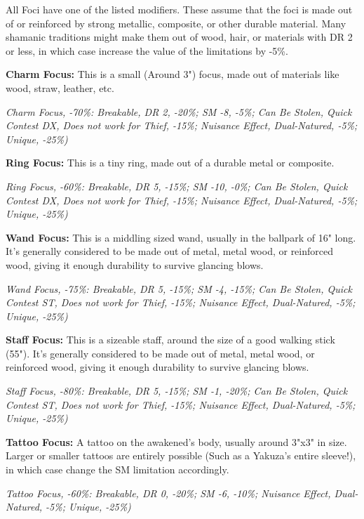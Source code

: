 \begin{multicols*}{2}
	All Foci have one of the listed modifiers. These assume that the foci is made out of or reinforced by strong metallic, composite, or other durable material. Many shamanic traditions might make them out of wood, hair, or materials with DR 2 or less, in which case increase the value of the limitations by -5\%.
	
	\textbf{Charm Focus:} This is a small (Around 3") focus, made out of materials like wood, straw, leather, etc.
	
	\textcolor{OliveGreen}{\textit{Charm Focus, -70\%: Breakable, DR 2, -20\%; SM -8, -5\%; Can Be Stolen, Quick Contest DX, Does not work for Thief, -15\%; Nuisance Effect, Dual-Natured, -5\%; Unique, -25\%)}}
	
	\textbf{Ring Focus:} This is a tiny ring, made out of a durable metal or composite.
	
	\textcolor{OliveGreen}{\textit{Ring Focus, -60\%: Breakable, DR 5, -15\%; SM -10, -0\%; Can Be Stolen, Quick Contest DX, Does not work for Thief, -15\%; Nuisance Effect, Dual-Natured, -5\%; Unique, -25\%)}}
	
	\textbf{Wand Focus:} This is a middling sized wand, usually in the ballpark of 16" long. It's generally considered to be made out of metal, metal wood, or reinforced wood, giving it enough durability to survive glancing blows.
	
	\textcolor{OliveGreen}{\textit{Wand Focus, -75\%: Breakable, DR 5, -15\%; SM -4, -15\%; Can Be Stolen, Quick Contest ST, Does not work for Thief, -15\%; Nuisance Effect, Dual-Natured, -5\%; Unique, -25\%)}}
	
	\textbf{Staff Focus:} This is a sizeable staff, around the size of a good walking stick (55"). It's generally considered to be made out of metal, metal wood, or reinforced wood, giving it enough durability to survive glancing blows.
	
	\textcolor{OliveGreen}{\textit{Staff Focus, -80\%: Breakable, DR 5, -15\%; SM -1, -20\%; Can Be Stolen, Quick Contest ST, Does not work for Thief, -15\%; Nuisance Effect, Dual-Natured, -5\%; Unique, -25\%)}}
	
	\textbf{Tattoo Focus:} A tattoo on the awakened's body, usually around 3"x3" in size. Larger or smaller tattoos are entirely possible (Such as a Yakuza's entire sleeve!), in which case change the SM limitation accordingly.
	
	\textcolor{OliveGreen}{\textit{Tattoo Focus, -60\%: Breakable, DR 0, -20\%; SM -6, -10\%; Nuisance Effect, Dual-Natured, -5\%; Unique, -25\%)}}
	

\end{multicols*}
